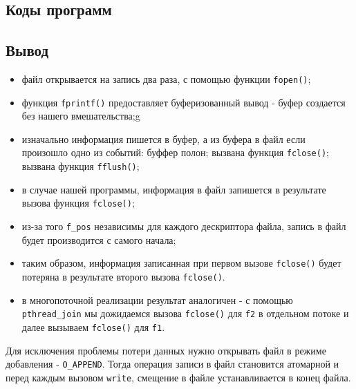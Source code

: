 
\subsection{Коды программ}





\newpage

\subsection*{Вывод}

\begin{itemize}
	\item файл открывается на запись два раза, с помощью функции \texttt{fopen()};
	\item функция \texttt{fprintf()} предоставляет буферизованный вывод - буфер создается без нашего вмешательства;g
	\item изначально информация пишется в буфер, а из буфера в файл если произошло одно из событий:
		\subitem буффер полон;
		\subitem вызвана функция \texttt{fclose()};
		\subitem вызвана функция \texttt{fflush()};
	\item в случае нашей программы, информация в файл запишется в результате вызова функция \texttt{fclose()};
	\item из-за того \texttt{f\_pos} независимы для каждого дескриптора файла, запись в файл будет производится с самого начала;
	\item таким образом, информация записанная при первом вызове \texttt{fclose()} будет потеряна в результате второго вызова \texttt{fclose()}.
	\item в многопоточной реализации результат аналогичен - с помощью \texttt{pthread\_join} мы дожидаемся вызова \texttt{fclose()} для \texttt{f2} в отдельном потоке и далее вызываем \texttt{fclose()} для \texttt{f1}.
\end{itemize}

Для исключения проблемы потери данных нужно открывать файл в режиме добавления - \texttt{O\_APPEND}. Тогда операция записи в файл становится атомарной и перед каждым вызовом \texttt{write}, смещение в файле устанавливается в конец файла.
